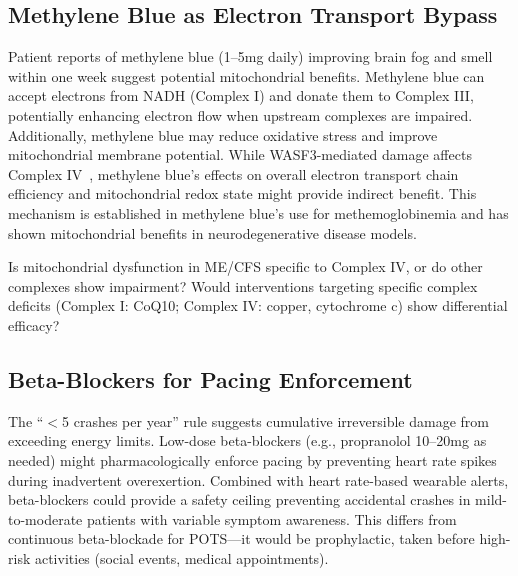 \subsection{Methylene Blue as Electron Transport Bypass}
\label{subsec:methylene-blue-mechanism}

\begin{hypothesis}
\label{hyp:mb-mito-enhancement}
Patient reports of methylene blue (1--5mg daily) improving brain fog and smell within one week suggest potential mitochondrial benefits. Methylene blue can accept electrons from NADH (Complex I) and donate them to Complex III, potentially enhancing electron flow when upstream complexes are impaired. Additionally, methylene blue may reduce oxidative stress and improve mitochondrial membrane potential. While WASF3-mediated damage affects Complex IV~\cite{wang2023wasf3}, methylene blue's effects on overall electron transport chain efficiency and mitochondrial redox state might provide indirect benefit. This mechanism is established in methylene blue's use for methemoglobinemia and has shown mitochondrial benefits in neurodegenerative disease models.
\end{hypothesis}

\begin{open_question}
\label{q:complex-specific}
Is mitochondrial dysfunction in ME/CFS specific to Complex IV, or do other complexes show impairment? Would interventions targeting specific complex deficits (Complex I: CoQ10; Complex IV: copper, cytochrome c) show differential efficacy?
\end{open_question}

\subsection{Beta-Blockers for Pacing Enforcement}
\label{subsec:beta-blocker-pacing}

\begin{speculation}
\label{spec:beta-blocker-pacing}
The ``$<$5 crashes per year'' rule suggests cumulative irreversible damage from exceeding energy limits. Low-dose beta-blockers (e.g., propranolol 10--20mg as needed) might pharmacologically enforce pacing by preventing heart rate spikes during inadvertent overexertion. Combined with heart rate-based wearable alerts, beta-blockers could provide a safety ceiling preventing accidental crashes in mild-to-moderate patients with variable symptom awareness. This differs from continuous beta-blockade for POTS---it would be prophylactic, taken before high-risk activities (social events, medical appointments).
\end{speculation}

